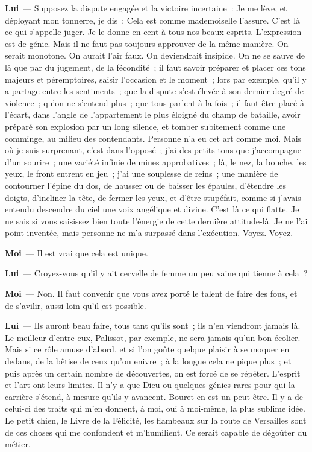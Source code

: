 \documentclass[french,twoside]{book} %
\newcommand{\labelchar}[1]{\textbf{\color{rubric} #1}}
\begin{document}
\labelchar{Lui} — Supposez la dispute engagée et la victoire incertaine : Je me lève, et déployant mon tonnerre, je dis : Cela est comme mademoiselle l’assure. C’est là ce qui s’appelle juger. Je le donne en cent à tous nos beaux esprits. L’expression est de génie. Mais il ne faut pas toujours approuver de la même manière. On serait monotone. On aurait l’air faux. On deviendrait insipide. On ne se sauve de là que par du jugement, de la fécondité ; il faut savoir préparer et placer ces tons majeurs et péremptoires, saisir l’occasion et le moment ; lors par exemple, qu’il y a partage entre les sentiments ; que la dispute s’est élevée à son dernier degré de violence ; qu’on ne s’entend plus ; que tous parlent à la fois ; il faut être placé à l’écart, dans l’angle de l’appartement le plus éloigné du champ de bataille, avoir préparé son explosion par un long silence, et tomber subitement comme une comminge, au milieu des contendants. Personne n’a eu cet art comme moi. Mais où je suis surprenant, c’est dans l’opposé ; j’ai des petits tons que j’accompagne d’un sourire ; une variété infinie de mines approbatives ; là, le nez, la bouche, les yeux, le front entrent en jeu ; j’ai une souplesse de reins ; une manière de contourner l’épine du dos, de hausser ou de baisser les épaules, d’étendre les doigts, d’incliner la tête, de fermer les yeux, et d’être stupéfait, comme si j’avais entendu descendre du ciel une voix angélique et divine. C’est là ce qui flatte. Je ne sais si vous saisissez bien toute l’énergie de cette dernière attitude-là. Je ne l’ai point inventée, mais personne ne m’a surpassé dans l’exécution. Voyez. Voyez.\par
\labelchar{Moi} — Il est vrai que cela est unique.\par
\labelchar{Lui} — Croyez-vous qu’il y ait cervelle de femme un peu vaine qui tienne à cela ?\par
\labelchar{Moi} — Non. Il faut convenir que vous avez porté le talent de faire des fous, et de s’avilir, aussi loin qu’il est possible.\par
\labelchar{Lui} — Ils auront beau faire, tous tant qu’ils sont ; ils n’en viendront jamais là. Le meilleur d’entre eux, Palissot, par exemple, ne sera jamais qu’un bon écolier. Mais si ce rôle amuse d’abord, et si l’on goûte quelque plaisir à se moquer en dedans, de la bêtise de ceux qu’on enivre ; à la longue cela ne pique plus ; et puis après un certain nombre de découvertes, on est forcé de se répéter. L’esprit et l’art ont leurs limites. Il n’y a que Dieu ou quelques génies rares pour qui la carrière s’étend, à mesure qu’ils y avancent. Bouret en est un peut-être. Il y a de celui-ci des traits qui m’en donnent, à moi, oui à moi-même, la plus sublime idée. Le petit chien, le Livre de la Félicité, les flambeaux sur la route de Versailles sont de ces choses qui me confondent et m’humilient. Ce serait capable de dégoûter du métier.\par
\end{document}
